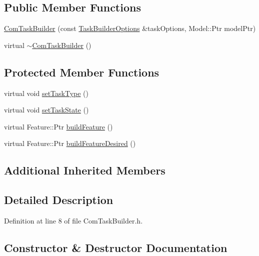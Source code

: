 \subsection*{Public Member Functions}
\begin{DoxyCompactItemize}
\item 
\hyperlink{classocra_1_1ComTaskBuilder_aa3cffa7682c1122e7e5bfa533a66f9bc}{Com\+Task\+Builder} (const \hyperlink{classocra_1_1TaskBuilderOptions}{Task\+Builder\+Options} \&task\+Options, Model\+::\+Ptr model\+Ptr)
\item 
virtual \hyperlink{classocra_1_1ComTaskBuilder_a17a4747e20d9e37f734a9f27820d068d}{$\sim$\+Com\+Task\+Builder} ()
\end{DoxyCompactItemize}
\subsection*{Protected Member Functions}
\begin{DoxyCompactItemize}
\item 
virtual void \hyperlink{classocra_1_1ComTaskBuilder_af9cfac995156297324ccbee1900f891c}{set\+Task\+Type} ()
\item 
virtual void \hyperlink{classocra_1_1ComTaskBuilder_ab514d4644f7dfeec3ae84a5b0b8bbc34}{set\+Task\+State} ()
\item 
virtual Feature\+::\+Ptr \hyperlink{classocra_1_1ComTaskBuilder_aa4e0d21159da91788a1d2806ddca84da}{build\+Feature} ()
\item 
virtual Feature\+::\+Ptr \hyperlink{classocra_1_1ComTaskBuilder_abdd4c74539a37ff4c719c0ac78812bf4}{build\+Feature\+Desired} ()
\end{DoxyCompactItemize}
\subsection*{Additional Inherited Members}


\subsection{Detailed Description}


Definition at line 8 of file Com\+Task\+Builder.\+h.



\subsection{Constructor \& Destructor Documentation}
\hypertarget{classocra_1_1ComTaskBuilder_aa3cffa7682c1122e7e5bfa533a66f9bc}{}\label{classocra_1_1ComTaskBuilder_aa3cffa7682c1122e7e5bfa533a66f9bc} 
